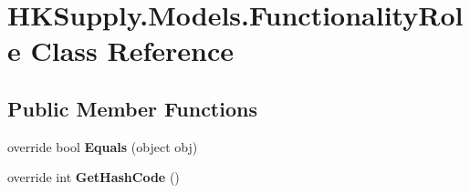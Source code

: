 \hypertarget{class_h_k_supply_1_1_models_1_1_functionality_role}{}\section{H\+K\+Supply.\+Models.\+Functionality\+Role Class Reference}
\label{class_h_k_supply_1_1_models_1_1_functionality_role}
\subsection*{Public Member Functions}
\begin{DoxyCompactItemize}
\item 
\mbox{\label{class_h_k_supply_1_1_models_1_1_functionality_role_a7d1146c2bece3c191ab8a8cbb8bd48b6}} 
override bool {\bfseries Equals} (object obj)
\item 
\mbox{\label{class_h_k_supply_1_1_models_1_1_functionality_role_aeab06b31e0fadbbb24099c8b0cad850c}} 
override int {\bfseries Get\+Hash\+Code} ()
\end{DoxyCompactItemize}
